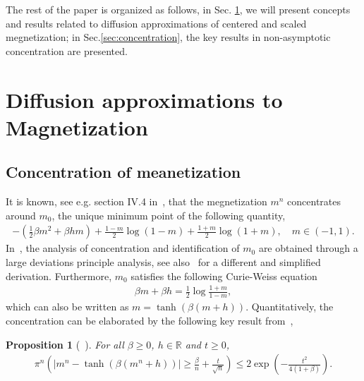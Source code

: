\documentclass{amsart}
\newcommand{\bS}{{\bf S}}               %
\newcommand{\Real}{\mathbb R}
\newtheorem{pro}[thm]{Proposition}
\newtheorem{rem}[thm]{Remark}
\begin{document}
The rest of the paper is organized as follows, in Sec. \ref{sec:results}, we will present concepts and results related to diffusion approximations of centered and scaled megnetization; in Sec.\ref{sec:concentration}, the key results in non-asymptotic concentration are presented. 

         
\section{Diffusion approximations to Magnetization}
\label{sec:results}

\subsection{Concentration of meanetization}
It is known, see e.g. section IV.4 in~\cite{ellis2006entropy}, that the megnetization $m^n$ concentrates around $m_0$, the unique minimum point of the following quantity, 
\begin{align}
	\label{eqn:rate_function}
	-\left(\frac12\beta m^2 +\beta h m \right) + \frac{1-m}{2} \log (1-m) + \frac{1+m}{2}\log (1+m), \quad m\in (-1,1).
\end{align}
In~\cite{ellis2006entropy}, the analysis of concentration and identification of $m_0$ are obtained through a large deviations principle analysis, see also~\cite{bovier_2006} for a different and simplified derivation.
Furthermore, $m_0$ satisfies the following Curie-Weiss equation
\begin{align}
	\label{eqn:curie-weiss}
	\beta m+\beta h =\frac12 \log \frac{1+m}{1-m},
\end{align}
which can also be written as $m =\tanh (\beta (m+h))$. Quantitatively, the concentration can be elaborated by the following key result from~\cite{Chatterjee2007},
\begin{pro} [~\cite{Chatterjee2007}]
	For all $\beta\ge 0$, $h\in \Real$ and $t\ge 0$,
	\begin{align}
		\label{eqn:concentration}
		\pi^n \left(|m^n-\tanh(\beta(m^n+h))|\ge \frac{\beta}{n} +\frac{t}{\sqrt{n}}\right) \le 2 \exp \left(-\frac{t^2}{4(1+\beta)}\right).
	\end{align}
\end{pro}



\end{document}
